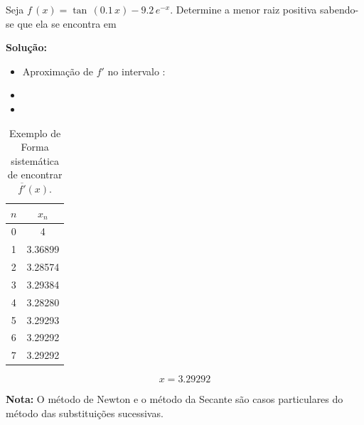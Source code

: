 \begin{example}
Seja $f\,(x) = \tan\,(0.1\,x) - 9.2 \, e^{-x}$. Determine a menor raiz positiva sabendo-se que ela se encontra em \esp{[3,\,4]}

\textbf{Solução:}

\begin{itemize}
 \item Aproximação de $f'$ no intervalo \esp{[3,\,4]}:

 \item {}

 \item {}

\end{itemize}

\begin{table}[htp]
\footnotesize
	\centering
		
		\begin{tabular}{|c|c|}
		\hline		
		\textbf{$n$} & \textbf{$x_{n}$}\\
		\hline \hline 
		0 & 4\\
		\hline 
		1 & 3.36899\\
		\hline 
		2 & 3.28574\\
		\hline 
		3 & 3.29384\\
		\hline
		4 & 3.28280\\
		\hline
		5 & 3.29293\\
		\hline
		6 & 3.29292\\
		\hline
		7 & 3.29292\\
		\hline
		\end{tabular}
	\caption{Exemplo de Forma sistemática de encontrar $\overline{f'}(x)$.}
	\label{tab:sucessivo2}
\end{table}

\[
 x = 3.29292
\]

\end{example}

\textbf{Nota:} O método de Newton e o método da Secante são casos particulares do método das substituições sucessivas.